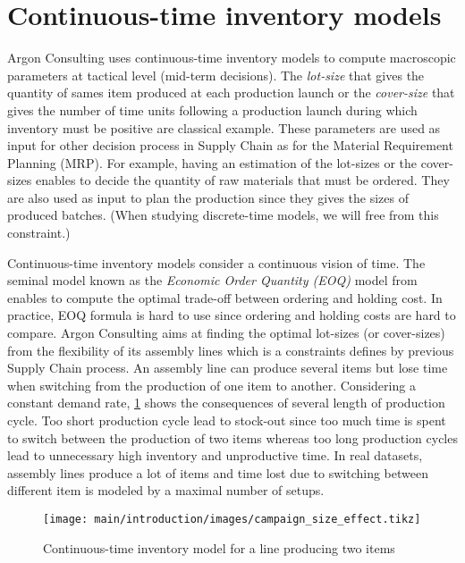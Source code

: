 \section{Continuous-time inventory models}
\label{sec:intro:en:continuous-time-inventory-models}


Argon Consulting uses continuous-time inventory models to compute macroscopic parameters at tactical level (mid-term decisions).
The \emph{lot-size} that gives the quantity of sames item produced at each production launch or the \emph{cover-size} that gives the number of time units following a production launch during which inventory must be positive are classical example.
These parameters are used as input for other decision process in Supply Chain as for the Material Requirement Planning (MRP).
For example, having an estimation of the lot-sizes or the cover-sizes enables to decide the quantity of raw materials that must be ordered.
They are also used as input to plan the production since they gives the sizes of produced batches.
(When studying discrete-time models, we will free from this constraint.)


Continuous-time inventory models consider a continuous vision of time.
The seminal model known as the \emph{Economic Order Quantity (EOQ)} model from \citet{Harris1913} enables to compute the optimal trade-off between ordering and holding cost.
In practice, EOQ formula is hard to use since ordering and holding costs are hard to compare.
Argon Consulting aims at finding the optimal lot-sizes (or cover-sizes) from the flexibility of its assembly lines which is a constraints defines by previous Supply Chain process.
An assembly line can produce several items but lose time when switching from the production of one item to another.
Considering a constant demand rate, \cref{fig:intro:en:continuous-time-inventory-model} shows the consequences of several length of production cycle.
Too short production cycle lead to stock-out since too much time is spent to switch between the production of two items whereas too long production cycles lead to unnecessary high inventory and unproductive time.
In real datasets, assembly lines produce a lot of items and time lost due to switching between different item is modeled by a maximal number of setups.


\begin{figure}[!ht]
  \centering
  \texttt{[image: main/introduction/images/campaign\_size\_effect.tikz]}
  \caption{Continuous-time inventory model for a line producing two items}
  \label{fig:intro:en:continuous-time-inventory-model}
\end{figure}


